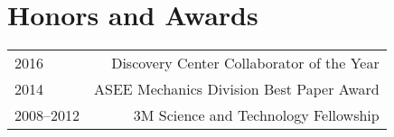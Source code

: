 \section*{Honors and Awards}
\begin{tabular}{L!{\VRule}R}
2016&Discovery Center Collaborator of the Year\\
2014&ASEE Mechanics Division Best Paper Award\\
2008--2012&3M Science and Technology Fellowship\\
\end{tabular}